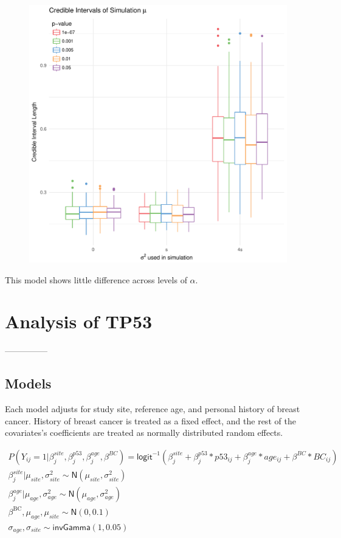 \documentclass[AMA,STIX1COL]{WileyNJD-v2}\usepackage[]{graphicx}\usepackage[]{color}
\makeatletter
\def\maxwidth{ %
  \ifdim\Gin@nat@width>\linewidth
    \linewidth
  \else
    \Gin@nat@width
  \fi
}
\newenvironment{knitrout}{}{} %
\makeatother
\begin{document}
\begin{figure}
\begin{knitrout}
\color{fgcolor}
\includegraphics[width=\maxwidth]{figure/unnamed-chunk-35-1} 

\end{knitrout}
\end{figure}
This model shows little difference across levels of $\alpha$.

\section{Analysis of TP53}\label{sec:tp53}
---------------
\subsection{Models}


Each model adjusts for study site, reference age, and personal history of breast cancer. History of breast cancer is treated as a fixed effect, and the rest of the covariates's coefficients are treated as normally distributed random effects. 

\begin{gather}
P(Y_{ij}=1| \beta^{site}_{ j}, \beta^{p53}_{j}, \beta^{age}_{j},\beta^{BC}) = \textsf{logit}^{-1}(\beta^{site}_{ j}+ \beta^{p53}_{j}*p53_{ij}+ \beta^{age}_{j}*age_{ij}+\beta^{BC}* BC_{ij})\\
\beta^{site}_{ j}|\mu_{site}, \sigma_{site}^{2}\sim \textsf{N}(\mu_{site}, \sigma_{site}^{2})\\
\beta^{age}_{j}|\mu_{age}, \sigma^{2}_{age}\sim \textsf{N}(\mu_{age}, \sigma^{2}_{age})\\
\beta^{\text{BC}}, \mu_{age},\mu_{site}\sim \textsf{N}(0,0.1)\\
\sigma_{age},\sigma_{site} \sim \textsf{invGamma}(1, 0.05)
\end{gather}
\end{document}
